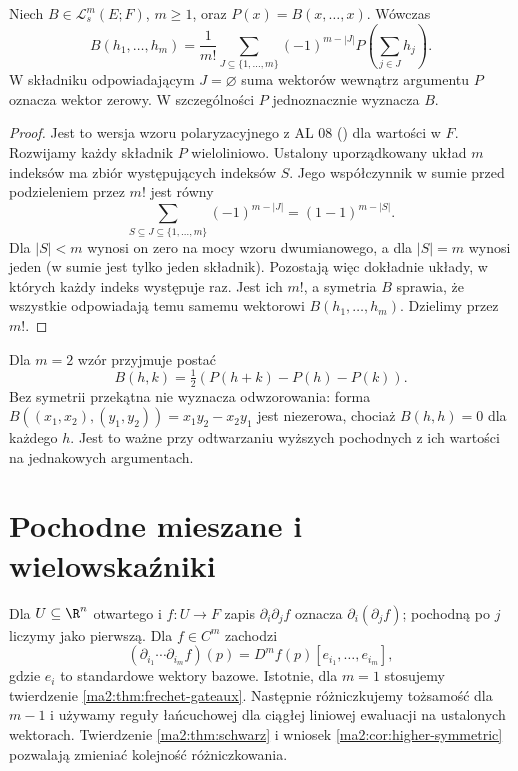\begin{stwierdzenie}
\label{ma2:prop:polarization}
Niech $B\in\mathcal L_s^m(E;F)$, $m\ge1$, oraz
$P(x)=B(x,\ldots,x)$. Wówczas
\[
 B(h_1,\ldots,h_m)=\frac1{m!}
 \sum_{J\subseteq\{1,\ldots,m\}}(-1)^{m-|J|}
 P\left(\sum_{j\in J}h_j\right).
\]
W składniku odpowiadającym $J=\varnothing$
suma wektorów wewnątrz argumentu $P$ oznacza wektor zerowy.
W szczególności $P$ jednoznacznie wyznacza $B$.
\end{stwierdzenie}
\begin{proof}
Jest to wersja wzoru polaryzacyjnego z AL 08
() dla wartości w $F$.
Rozwijamy każdy składnik $P$ wieloliniowo.
Ustalony uporządkowany układ $m$ indeksów
ma zbiór występujących indeksów $S$. Jego
współczynnik w sumie przed podzieleniem przez $m!$
jest równy
\[
 \sum_{S\subseteq J\subseteq\{1,\ldots,m\}}(-1)^{m-|J|}
 =(1-1)^{m-|S|}.
\]
Dla $|S|<m$ wynosi on zero na mocy wzoru dwumianowego,
a dla $|S|=m$ wynosi jeden (w sumie jest tylko jeden
składnik). Pozostają więc dokładnie układy, w których
każdy indeks występuje raz. Jest ich $m!$, a symetria
$B$ sprawia, że wszystkie odpowiadają temu samemu
wektorowi $B(h_1,\ldots,h_m)$. Dzielimy przez $m!$.
\end{proof}

Dla $m=2$ wzór przyjmuje postać
\[
 B(h,k)=\tfrac12(P(h+k)-P(h)-P(k)).
\]
Bez symetrii przekątna nie wyznacza odwzorowania:
forma $B((x_1,x_2),(y_1,y_2))=x_1y_2-x_2y_1$
jest niezerowa, chociaż $B(h,h)=0$ dla każdego $h$.
Jest to ważne przy odtwarzaniu wyższych pochodnych
z ich wartości na jednakowych argumentach.

\section{Pochodne mieszane i wielowskaźniki}

Dla $U\subseteq\R^n$ otwartego i $f:U\to F$ zapis
$\partial_i\partial_j f$ oznacza
$\partial_i(\partial_j f)$; pochodną po $j$ liczymy
jako pierwszą. Dla $f\in C^m$ zachodzi
\[
 (\partial_{i_1}\cdots\partial_{i_m} f)(p)
 =D^mf(p)[e_{i_1},\ldots,e_{i_m}],
\]
gdzie $e_i$ to standardowe wektory bazowe.
Istotnie, dla $m=1$ stosujemy twierdzenie
\ref{ma2:thm:frechet-gateaux}. Następnie różniczkujemy
tożsamość dla $m-1$ i używamy reguły łańcuchowej
dla ciągłej liniowej ewaluacji na ustalonych wektorach.
Twierdzenie \ref{ma2:thm:schwarz} i wniosek
\ref{ma2:cor:higher-symmetric} pozwalają zmieniać
kolejność różniczkowania.

